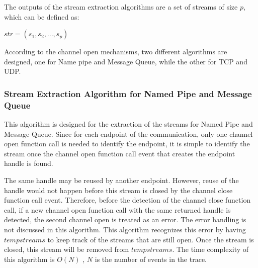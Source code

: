 The outputs of the stream extraction algorithms are a set of streams of size $p$, which can be defined as:

$str = (s_1, s_2, ..., s_p)$

According to the channel open mechanisms, two different algorithms are designed, one for Name pipe and Message Queue, while the other for TCP and UDP. 

\subsubsection{Stream Extraction Algorithm for Named Pipe and Message Queue}
This algorithm is designed for the extraction of the streams for Named Pipe and Message Queue. Since for each endpoint of the communication, only one channel open function call is needed to identify the endpoint, it is simple to identify the stream once the channel open function call event that creates the endpoint handle is found. 

The same handle may be reused by another endpoint. However, reuse of the handle would not happen before this stream is closed by the channel close function call event. Therefore, before the detection of the channel close function call, if a new channel open function call with the same returned handle is detected, the second channel open is treated as an error. The error handling is not discussed in this algorithm. This algorithm recognizes this error by having $tempstreams$ to keep track of the streams that are still open. Once the stream is closed, this stream will be removed from $tempstreams$. The time complexity of this algorithm is $O(N)$ , $N$ is the number of events in the trace.

